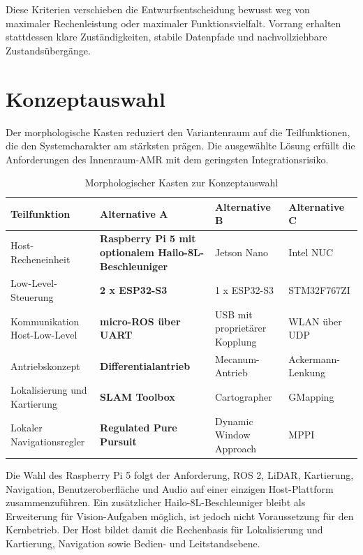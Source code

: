 Diese Kriterien verschieben die Entwurfsentscheidung bewusst weg von maximaler Rechenleistung oder maximaler Funktionsvielfalt. Vorrang erhalten stattdessen klare Zuständigkeiten, stabile Datenpfade und nachvollziehbare Zustandsübergänge.

\section{Konzeptauswahl}

Der morphologische Kasten reduziert den Variantenraum auf die Teilfunktionen, die den Systemcharakter am stärksten prägen. Die ausgewählte Lösung erfüllt die Anforderungen des Innenraum-AMR mit dem geringsten Integrationsrisiko.

\begin{table}[htbp]
  \centering
  \caption{Morphologischer Kasten zur Konzeptauswahl}
  \small
  \begin{tabularx}{\textwidth}{l L L L}
    \toprule
    \textbf{Teilfunktion} & \textbf{Alternative A} & \textbf{Alternative B} & \textbf{Alternative C} \\
    \midrule
    Host-Recheneinheit & \textbf{Raspberry Pi 5 mit optionalem Hailo-8L-Beschleuniger} & Jetson Nano & Intel NUC \\
    \addlinespace
    Low-Level-Steuerung & \textbf{2 x ESP32-S3} & 1 x ESP32-S3 & STM32F767ZI \\
    \addlinespace
    Kommunikation Host-Low-Level & \textbf{micro-ROS über UART} & USB mit proprietärer Kopplung & WLAN über UDP \\
    \addlinespace
    Antriebskonzept & \textbf{Differentialantrieb} & Mecanum-Antrieb & Ackermann-Lenkung \\
    \addlinespace
    Lokalisierung und Kartierung & \textbf{SLAM Toolbox} & Cartographer & GMapping \\
    \addlinespace
    Lokaler Navigationsregler & \textbf{Regulated Pure Pursuit} & Dynamic Window Approach & MPPI \\
    \bottomrule
  \end{tabularx}
\end{table}

Die Wahl des Raspberry Pi 5 folgt der Anforderung, ROS 2, LiDAR, Kartierung, Navigation, Benutzeroberfläche und Audio auf einer einzigen Host-Plattform zusammenzuführen. Ein zusätzlicher Hailo-8L-Beschleuniger bleibt als Erweiterung für Vision-Aufgaben möglich, ist jedoch nicht Voraussetzung für den Kernbetrieb. Der Host bildet damit die Rechenbasis für Lokalisierung und Kartierung, Navigation sowie Bedien- und Leitstandsebene.

